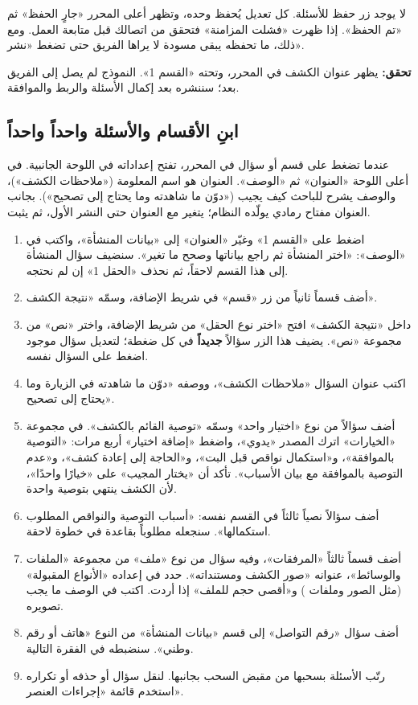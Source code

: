 \begin{rcnote}
لا يوجد زر حفظ للأسئلة. كل تعديل يُحفظ وحده، وتظهر أعلى المحرر «جارٍ الحفظ» ثم «تم الحفظ». إذا ظهرت «فشلت المزامنة» فتحقق من اتصالك قبل متابعة العمل. ومع ذلك، ما تحفظه يبقى مسودة لا يراها الفريق حتى تضغط «نشر».
\end{rcnote}

\textbf{تحقق:} يظهر عنوان الكشف في المحرر، وتحته «القسم 1». النموذج لم يصل إلى الفريق بعد؛ سننشره بعد إكمال الأسئلة والربط والموافقة.

\subsection{ابنِ الأقسام والأسئلة واحداً واحداً}

عندما تضغط على قسم أو سؤال في المحرر، تفتح إعداداته في اللوحة الجانبية. في أعلى اللوحة «العنوان» ثم «الوصف». العنوان هو اسم المعلومة («ملاحظات الكشف»)، والوصف يشرح للباحث كيف يجيب («دوّن ما شاهدته وما يحتاج إلى تصحيح»). بجانب العنوان مفتاح رمادي يولّده النظام؛ يتغير مع العنوان حتى النشر الأول، ثم يثبت.

\begin{enumerate}
\item اضغط على «القسم 1» وغيّر «العنوان» إلى «بيانات المنشأة»، واكتب في «الوصف»: «اختر المنشأة ثم راجع بياناتها وصحح ما تغير». سنضيف سؤال المنشأة إلى هذا القسم لاحقاً، ثم نحذف «الحقل 1» إن لم نحتجه.
\item أضف قسماً ثانياً من زر «قسم» في شريط الإضافة، وسمّه «نتيجة الكشف».
\item داخل «نتيجة الكشف» افتح «اختر نوع الحقل» من شريط الإضافة، واختر «نص» من مجموعة «نص». يضيف هذا الزر سؤالاً \textbf{جديداً} في كل ضغطة؛ لتعديل سؤال موجود اضغط على السؤال نفسه.
\item اكتب عنوان السؤال «ملاحظات الكشف»، ووصفه «دوّن ما شاهدته في الزيارة وما يحتاج إلى تصحيح».
\item أضف سؤالاً من نوع «اختيار واحد» وسمّه «توصية القائم بالكشف». في مجموعة «الخيارات» اترك المصدر «يدوي»، واضغط «إضافة اختيار» أربع مرات: «التوصية بالموافقة»، و«استكمال نواقص قبل البت»، و«الحاجة إلى إعادة كشف»، و«عدم التوصية بالموافقة مع بيان الأسباب». تأكد أن «يختار المجيب» على «خيارًا واحدًا»، لأن الكشف ينتهي بتوصية واحدة.
\item أضف سؤالاً نصياً ثالثاً في القسم نفسه: «أسباب التوصية والنواقص المطلوب استكمالها». سنجعله مطلوباً بقاعدة في خطوة لاحقة.
\item أضف قسماً ثالثاً «المرفقات»، وفيه سؤال من نوع «ملف» من مجموعة «الملفات والوسائط»، عنوانه «صور الكشف ومستنداته». حدد في إعداده «الأنواع المقبولة» (مثل الصور وملفات ) و«أقصى حجم للملف» إذا أردت. اكتب في الوصف ما يجب تصويره.
\item أضف سؤال «رقم التواصل» إلى قسم «بيانات المنشأة» من النوع «هاتف أو رقم وطني». سنضبطه في الفقرة التالية.
\item رتّب الأسئلة بسحبها من مقبض السحب بجانبها. لنقل سؤال أو حذفه أو تكراره استخدم قائمة «إجراءات العنصر».
\end{enumerate}

